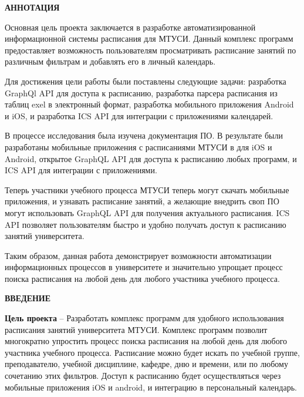 \newpage
\begin{center}
    \textbf{\large АННОТАЦИЯ}
\end{center}


Основная цель проекта заключается в разработке автоматизированной информационной системы расписания для МТУСИ.
Данный комплекс программ предоставляет возможность пользователям просматривать расписание занятий по различным фильтрам и добавлять его в личный календарь.

Для достижения цели работы были поставлены следующие задачи: разработка GraphQl API для доступа к расписанию,
разработка парсера расписания из таблиц exel в электронный формат, разработка мобильного приложения Android и iOS, и 
разработка ICS API для интеграции с приложениями календарей.

В процессе исследования была изучена документация ПО.
В результате были разработаны мобильные приложения с расписаниями МТУСИ в для iOS и Android,
открытое GraphQL API для доступа к расписанию любых программ, и ICS API для интеграции с приложениями.

Теперь участники учебного процесса МТУСИ теперь могут скачать мобильные приложения, и узнавать расписание занятий, 
а желающие внедрить своп ПО могут использовать GraphQL API для получения актуального расписания.
ICS API позволяет пользователям быстро и удобно получать доступ к расписанию занятий университета.

Таким образом, данная работа демонстрирует возможности автоматизации информационных процессов в университете и
значительно упрощает процесс поиска расписания на любой день для любого участника учебного процесса.

\onehalfspacing
\setcounter{page}{2}

\newpage
\renewcommand{\contentsname}{\centerline{\large СОДЕРЖАНИЕ}}
\tableofcontents

\newpage
\begin{center}
\textbf{\large ВВЕДЕНИЕ}
\end{center}


\textbf{Цель проекта} -- Разработать комплекс программ для удобного использования расписания занятий университета МТУСИ.
Комплекс программ позволит многократно упростить процесс поиска расписания на любой день для любого участника учебного процесса.
Расписание можно будет искать по учебной группе, преподавателю, учебной дисциплине, кафедре, дню и времени,
или по любому сочетанию этих фильтров.
Доступ к расписанию будет осуществляться через мобильные приложения iOS и android, и интеграцию в персональный календарь.

